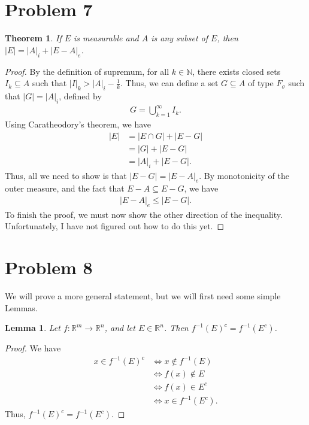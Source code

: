 \documentclass[10pt,a4paper]{article}
\theoremstyle{theorem}
\newtheorem{theorem}{Theorem}
\newtheorem{lemma}{Lemma}
\theoremstyle{definition}
\begin{document}
\section*{Problem 7}
\begin{theorem}
If $E$ is measurable and $A$ is any subset of $E$, then $|E| = |A|_i + |E - A|_e$.
\end{theorem}

\begin{proof}
By the definition of supremum,  for all $k \in \mathbb{N}$, there exists closed sets $I_k \subseteq A$ such that $|I|_k > |A|_i - \frac{1}{k}$. Thus, we can define a set $G \subseteq A$ of type $F_\sigma$ such that $|G| = |A|_i$, defined by
\begin{align*}
G = \bigcup_{k=1}^\infty I_k.
\end{align*}
Using Caratheodory's theorem, we have
\begin{align*}
|E| &= |E \cap G| + |E - G|\\
&= |G| + |E - G|\\
&= |A|_i + |E - G|.
\end{align*}
Thus, all we need to show is that $|E - G| = |E - A|_e$. By monotonicity of the outer measure, and the fact that $E - A \subseteq E - G$, we have
\begin{align*}
|E - A|_e \leq |E - G|.
\end{align*}
To finish the proof, we must now show the other direction of the inequality. Unfortunately, I have not figured out how to do this yet.
\end{proof}

\section*{Problem 8}
We will prove a more general statement, but we will first need some simple Lemmas.
\begin{lemma}
Let $f: \mathbb{R}^m \to \mathbb{R}^n$, and let $E \in \mathbb{R}^n$. Then $f^{-1}(E)^c = f^{-1}(E^c)$.
\end{lemma}

\begin{proof}
We have 
\begin{align*}
x \in f^{-1}(E)^c &\iff x \not\in f^{-1}(E)\\
&\iff f(x) \not \in E\\
&\iff f(x) \in E^c\\
&\iff x \in f^{-1}(E^c).
\end{align*}
Thus,  $f^{-1}(E)^c = f^{-1}(E^c)$.
\end{proof}
\end{document}
